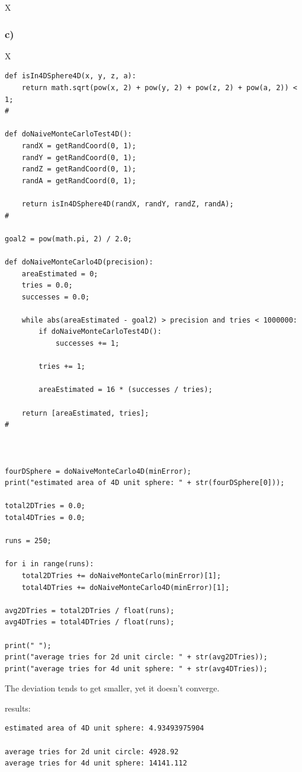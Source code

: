 X



\subsubsection{c)}

X

\begin{lstlisting}[caption=todo]
def isIn4DSphere4D(x, y, z, a):
	return math.sqrt(pow(x, 2) + pow(y, 2) + pow(z, 2) + pow(a, 2)) < 1;
#

def doNaiveMonteCarloTest4D():
	randX = getRandCoord(0, 1);
	randY = getRandCoord(0, 1);
	randZ = getRandCoord(0, 1);
	randA = getRandCoord(0, 1);
	
	return isIn4DSphere4D(randX, randY, randZ, randA);
#

goal2 = pow(math.pi, 2) / 2.0;

def doNaiveMonteCarlo4D(precision):
	areaEstimated = 0;
	tries = 0.0;
	successes = 0.0;

	while abs(areaEstimated - goal2) > precision and tries < 1000000:
		if doNaiveMonteCarloTest4D():
			successes += 1;
		
		tries += 1;
		
		areaEstimated = 16 * (successes / tries);
	
	return [areaEstimated, tries];
#



fourDSphere = doNaiveMonteCarlo4D(minError);
print("estimated area of 4D unit sphere: " + str(fourDSphere[0]));

total2DTries = 0.0;
total4DTries = 0.0;

runs = 250;

for i in range(runs):
	total2DTries += doNaiveMonteCarlo(minError)[1];
	total4DTries += doNaiveMonteCarlo4D(minError)[1];

avg2DTries = total2DTries / float(runs);
avg4DTries = total4DTries / float(runs);

print(" ");
print("average tries for 2d unit circle: " + str(avg2DTries));
print("average tries for 4d unit sphere: " + str(avg4DTries));

\end{lstlisting}

The deviation tends to get smaller, yet it doesn't converge.

results:

\begin{lstlisting}[caption=Result of 1.1 a), keywordstyle=\color{black}]
estimated area of 4D unit sphere: 4.93493975904

average tries for 2d unit circle: 4928.92
average tries for 4d unit sphere: 14141.112
\end{lstlisting}

